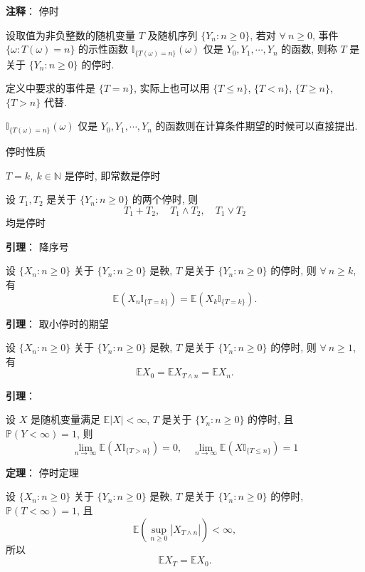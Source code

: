 \documentclass[openany]{ctexbook}
\theoremstyle{kaiti}
\theoremstyle{normal}
\begin{document}
\textbf{注释}： 停时

设取值为非负整数的随机变量 $T$ 及随机序列 $\{Y_n:n\geqslant0\}$, 若对 $\forall~n\geqslant0$, 事件 $\{\omega:T(\omega)=n\}$ 的示性函数 $\mathbb{I}_{\{T(\omega)=n\}}(\omega)$ 仅是 $Y_0,Y_1,\cdots,Y_n$ 的函数, 则称 $T$ 是关于 $\{Y_n:n\geqslant0\}$ 的停时.

定义中要求的事件是 $\{T=n\}$, 实际上也可以用 $\{T\leqslant n\}$, $\{T< n\}$, $\{T\geqslant n\}$, $\{T>n\}$ 代替.

$\mathbb{I}_{\{T(\omega)=n\}}(\omega)$ 仅是 $Y_0,Y_1,\cdots,Y_n$ 的函数则在计算条件期望的时候可以直接提出.

停时性质

$T=k,~k\in\mathbb{N}$ 是停时, 即常数是停时

设 $T_1,T_2$ 是关于 $\{Y_n:n\geqslant0\}$ 的两个停时, 则
\begin{equation}
  T_1+T_2,\quad T_1\wedge T_2,\quad T_1\vee T_2
\end{equation} 均是停时

\textbf{引理}： 降序号

设 $\{X_n:n\geqslant0\}$ 关于 $\{Y_n:n\geqslant0\}$ 是鞅, $T$ 是关于 $\{Y_n:n\geqslant0\}$ 的停时, 则 $\forall~n\geqslant k$, 有
\begin{equation}
  \mathbb{E}(X_n\mathbb{I}_{\{T=k\}})=\mathbb{E}(X_k\mathbb{I}_{\{T=k\}}).
\end{equation}

\textbf{引理}： 取小停时的期望

设 $\{X_n:n\geqslant0\}$ 关于 $\{Y_n:n\geqslant0\}$ 是鞅, $T$ 是关于 $\{Y_n:n\geqslant0\}$ 的停时, 则 $\forall~n\geqslant 1$, 有
\begin{equation}
  \mathbb{E}X_0=\mathbb{E}X_{T\wedge n}=\mathbb{E}X_n.
\end{equation}

\textbf{引理}：

设 $X$ 是随机变量满足 $\mathbb{E}|X|<\infty$, $T$ 是关于 $\{Y_n:n\geqslant0\}$ 的停时, 且 $\mathbb{P}(Y<\infty)=1$, 则
\begin{equation}
  \lim_{n\to\infty}\mathbb{E}(X\mathbb{I}_{\{T>n\}})=0,\quad \lim_{n\to\infty}\mathbb{E}(X\mathbb{I}_{\{T\leqslant n\}})=1
\end{equation}

\textbf{定理}： 停时定理

设 $\{X_n:n\geqslant0\}$ 关于 $\{Y_n:n\geqslant0\}$ 是鞅, $T$ 是关于 $\{Y_n:n\geqslant0\}$ 的停时, $\mathbb{P}(T<\infty)=1$, 且 
\begin{equation}
  \mathbb{E}\left(\sup_{n\geqslant0}|X_{T\wedge n}|\right)<\infty,
\end{equation}
所以 
\begin{equation}
  \mathbb{E}X_T=\mathbb{E}X_0.
\end{equation}
\end{document}
